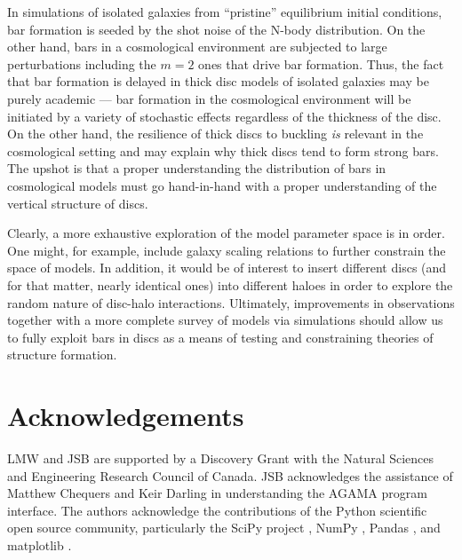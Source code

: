 In simulations of isolated galaxies from ``pristine'' equilibrium
initial conditions, bar formation is seeded by the shot noise of the
N-body distribution.  On the other hand, bars in a cosmological
environment are subjected to large perturbations including the $m=2$
ones that drive bar formation.  Thus, the fact that bar formation is
delayed in thick disc models of isolated galaxies may be purely
academic --- bar formation in the cosmological environment will be
initiated by a variety of stochastic effects regardless of the
thickness of the disc.  On the other hand, the resilience of thick
discs to buckling {\it is} relevant in the cosmological setting and
may explain why thick discs tend to form strong bars.  The upshot is 
that a proper understanding the distribution of bars in cosmological models
must go hand-in-hand with a proper understanding of the vertical 
structure of discs.

Clearly, a more exhaustive exploration of the model parameter space is
in order.  One might, for example, include galaxy scaling relations to
further constrain the space of models.  In addition, it would be of
interest to insert different discs (and for that matter, nearly
identical ones) into different haloes in order to explore the
random nature of disc-halo interactions.  Ultimately, improvements
in observations together with a more complete survey of models via
simulations should allow us to fully exploit bars in discs as a means
of testing and constraining theories of structure formation.

\section*{Acknowledgements}
{LMW and JSB are supported by a Discovery Grant with the Natural
  Sciences and Engineering Research Council of Canada. JSB
  acknowledges the assistance of Matthew Chequers and Keir Darling in
  understanding the \textsc{AGAMA} program interface. The authors
  acknowledge the contributions of the Python scientific open source community,
  particularly the SciPy project \citep{scipy}, NumPy \citep{numpy}, Pandas \citep{pandas},
  and matplotlib \citep{matplotlib}.}





